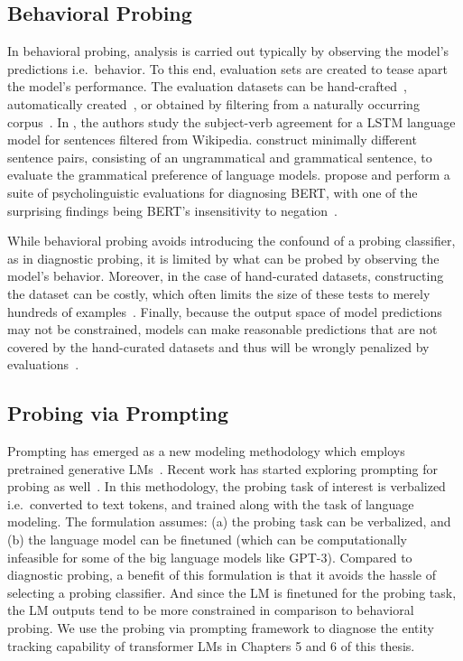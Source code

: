 \documentclass[12pt]{thesis-umich}[thesis]
\begin{document}
\subsection{Behavioral Probing}
 \nocite{goldberg2019assessing}  
In behavioral probing, analysis is carried out typically by observing the model's predictions i.e.\ behavior. 
To this end, evaluation sets are created to tease apart the model's performance. 
The evaluation datasets can be hand-crafted~\cite{ettinger-2020-bert}, automatically created~\cite{gulordava-etal-2018-colorless}, or obtained by filtering from a naturally occurring corpus~\cite{linzen-etal-2016-assessing}. 
In \citet{linzen-etal-2016-assessing}, the authors study the subject-verb agreement for a LSTM language model for sentences filtered from Wikipedia. 
\citet{marvin-linzen-2018-targeted} construct minimally different sentence pairs, consisting of an ungrammatical and grammatical sentence, to evaluate the grammatical preference of language models. \citet{ettinger-2020-bert} propose and perform a suite of psycholinguistic evaluations for diagnosing BERT, with one of the surprising findings being BERT's insensitivity to negation~\cite{Fischler1983BrainPR}.
 
While behavioral probing avoids introducing the confound of a probing classifier, as in diagnostic probing, it is limited by what can be probed by observing the model's behavior. Moreover, in the case of hand-curated datasets, constructing the dataset can be costly, which often limits the size of these tests to merely hundreds of examples~\cite{Fischler1983BrainPR, chow2015bag}. Finally, because the output space of model predictions may not be constrained, models can make reasonable predictions that are not covered by the hand-curated datasets and thus will be wrongly penalized by evaluations~\cite{lialin-etal-2022-life}.

\subsection{Probing via Prompting}
Prompting has emerged as a new modeling methodology which employs pretrained generative LMs~\cite{brown2020language, Liu2021PretrainPA}. 
Recent work has started exploring prompting for probing as well~\cite{toshniwal-etal-2022-chess, li-etal-2022-probing-via}. 
In this methodology, the probing task of interest is verbalized i.e.\ converted to text tokens, and trained along with the task of language modeling. 
The formulation assumes: (a) the probing task can be verbalized, and (b) the language model can be finetuned (which can be computationally infeasible for some of the big language models like GPT-3).  
Compared to diagnostic probing, a benefit of this formulation is that it avoids the hassle of selecting a probing classifier. And since the LM is finetuned for the probing task, the LM outputs tend to be more constrained in comparison to behavioral probing. 
We use the probing via prompting framework to diagnose the entity tracking capability of transformer LMs in Chapters 5 and 6 of this thesis. 
\end{document}
